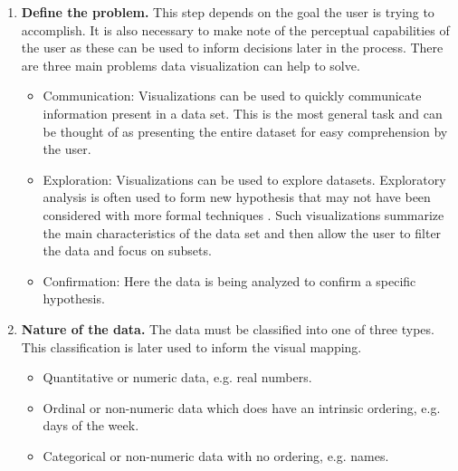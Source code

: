 \documentclass[a4paper, 11pt, titlepage, onehalfspacing]{report}
\begin{document}
\begin{enumerate}
\label{Mazza_Process}
  \item \textbf{Define the problem.} This step depends on the goal the user is trying to accomplish. It is also necessary to make note of the perceptual capabilities of the user as these can be used to inform decisions later in the process. There are three main problems data visualization can help to solve.

    \begin{itemize}
    \item Communication: Visualizations can be used to quickly communicate information present in a data set. This is the most general task and can be thought of as presenting the entire dataset for easy comprehension by the user.
    \item Exploration: Visualizations can be used to explore datasets. Exploratory analysis is often used to form new hypothesis that may not have been considered with more formal techniques \cite{tukey1977exploratory}. Such visualizations summarize the main characteristics of the data set and then  allow the user to filter the data and focus on subsets.
    \item Confirmation: Here the data is being analyzed to confirm a specific hypothesis.
  \end{itemize}

  \item \textbf{Nature of the data.} The data must be classified into one of three types. This classification is later used to inform the visual mapping.
  \begin{itemize}
    \item Quantitative or numeric data, e.g. real numbers. 
    \item Ordinal or non-numeric data which does have an intrinsic ordering, e.g. days of the week.
    \item Categorical or non-numeric data with no ordering, e.g. names.
  \end{itemize}


\end{enumerate}
\end{document}
